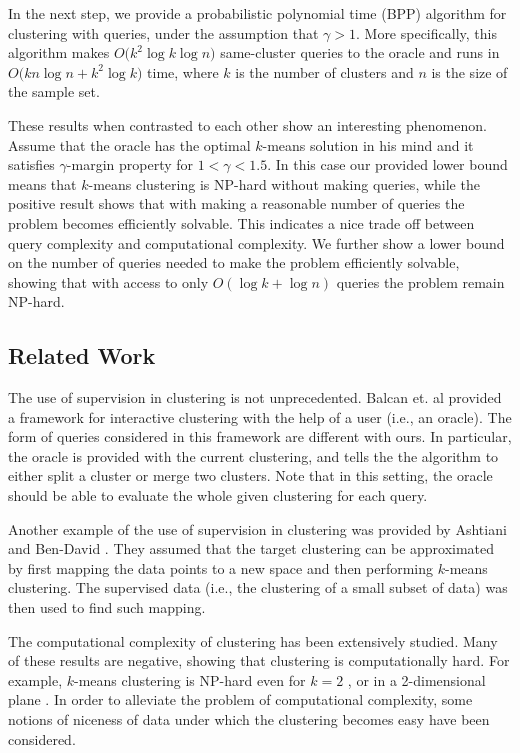 \documentclass[orivec]{llncs}
\begin{document}
In the next step, we provide a probabilistic polynomial time (BPP) algorithm for clustering with queries, under the assumption that $\gamma > 1$. More specifically, this algorithm makes $O\big(k^2\log k\log n)$ same-cluster queries to the oracle and runs in $O\big(kn\log n + k^2\log k)$ time, where $k$ is the number of clusters and $n$ is the size of the sample set.

These results when contrasted to each other show an interesting phenomenon. Assume that the oracle has the optimal $k$-means solution in his mind and it satisfies $\gamma$-margin property for $1<\gamma <1.5$. In this case our provided lower bound means that $k$-means clustering is NP-hard without making queries, while the positive result shows that with making a reasonable number of queries the problem becomes efficiently solvable. This indicates a nice trade off between query complexity and computational complexity. We further show a lower bound on the number of queries needed to make the problem efficiently solvable, showing that with access to only $O(\log k + \log n)$ queries the problem remain NP-hard.

\subsection{Related Work}

The use of supervision in clustering is not unprecedented. Balcan et. al \cite{balcan2008clustering} provided a framework for interactive clustering with the help of a user (i.e., an oracle). The form of queries considered in this framework are different with ours. In particular, the oracle is provided with the current clustering, and tells the the algorithm to either split a cluster or merge two clusters. Note that in this setting, the oracle should be able to evaluate the whole given clustering for each query.

Another example of the use of supervision in clustering was provided by Ashtiani and Ben-David \cite{ashtiani2015representation}. They assumed that the target clustering can be approximated by first mapping the data points to a new space and then performing $k$-means clustering. The supervised data (i.e., the clustering of a small subset of data) was then used to find such mapping.

The computational complexity of clustering has been extensively studied. Many of these results are negative, showing that clustering is computationally hard. For example, $k$-means clustering is NP-hard even for $k=2$ \cite{dasgupta2008hardness}, or in a 2-dimensional plane \cite{vattani2009hardness,mahajan2009planar}. In order to alleviate the problem of computational complexity, some notions of niceness of data under which the clustering becomes easy have been considered.  
\end{document}

